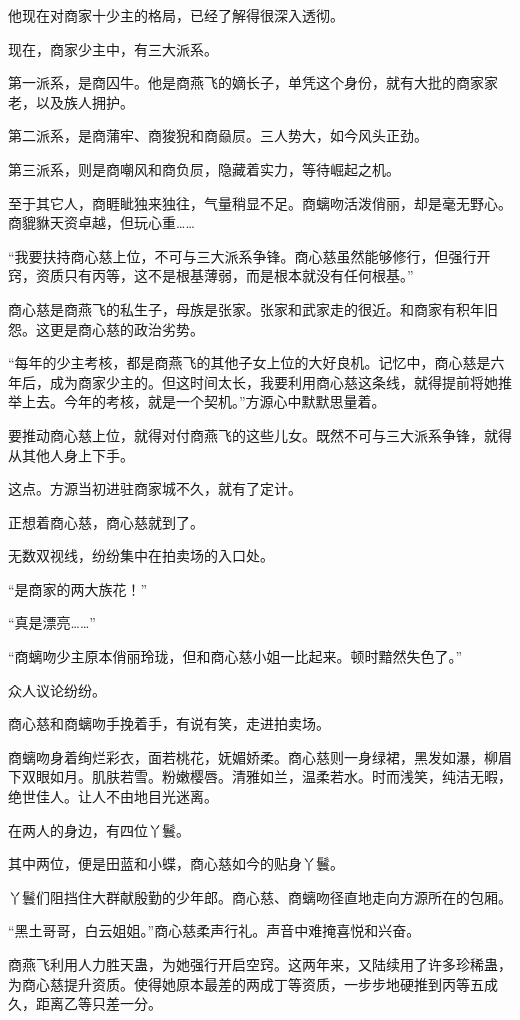 \begin{this_body}
他现在对商家十少主的格局，已经了解得很深入透彻。

现在，商家少主中，有三大派系。

第一派系，是商囚牛。他是商燕飞的嫡长子，单凭这个身份，就有大批的商家家老，以及族人拥护。

第二派系，是商蒲牢、商狻猊和商赑屃。三人势大，如今风头正劲。

第三派系，则是商嘲风和商负屃，隐藏着实力，等待崛起之机。

至于其它人，商睚眦独来独往，气量稍显不足。商螭吻活泼俏丽，却是毫无野心。商貔貅天资卓越，但玩心重……

“我要扶持商心慈上位，不可与三大派系争锋。商心慈虽然能够修行，但强行开窍，资质只有丙等，这不是根基薄弱，而是根本就没有任何根基。”

商心慈是商燕飞的私生子，母族是张家。张家和武家走的很近。和商家有积年旧怨。这更是商心慈的政治劣势。

“每年的少主考核，都是商燕飞的其他子女上位的大好良机。记忆中，商心慈是六年后，成为商家少主的。但这时间太长，我要利用商心慈这条线，就得提前将她推举上去。今年的考核，就是一个契机。”方源心中默默思量着。

要推动商心慈上位，就得对付商燕飞的这些儿女。既然不可与三大派系争锋，就得从其他人身上下手。

这点。方源当初进驻商家城不久，就有了定计。

正想着商心慈，商心慈就到了。

无数双视线，纷纷集中在拍卖场的入口处。

“是商家的两大族花！”

“真是漂亮……”

“商螭吻少主原本俏丽玲珑，但和商心慈小姐一比起来。顿时黯然失色了。”

众人议论纷纷。

商心慈和商螭吻手挽着手，有说有笑，走进拍卖场。

商螭吻身着绚烂彩衣，面若桃花，妩媚娇柔。商心慈则一身绿裙，黑发如瀑，柳眉下双眼如月。肌肤若雪。粉嫩樱唇。清雅如兰，温柔若水。时而浅笑，纯洁无暇，绝世佳人。让人不由地目光迷离。

在两人的身边，有四位丫鬟。

其中两位，便是田蓝和小蝶，商心慈如今的贴身丫鬟。

丫鬟们阻挡住大群献殷勤的少年郎。商心慈、商螭吻径直地走向方源所在的包厢。

“黑土哥哥，白云姐姐。”商心慈柔声行礼。声音中难掩喜悦和兴奋。

商燕飞利用人力胜天蛊，为她强行开启空窍。这两年来，又陆续用了许多珍稀蛊，为商心慈提升资质。使得她原本最差的两成丁等资质，一步步地硬推到丙等五成久，距离乙等只差一分。


\end{this_body}
